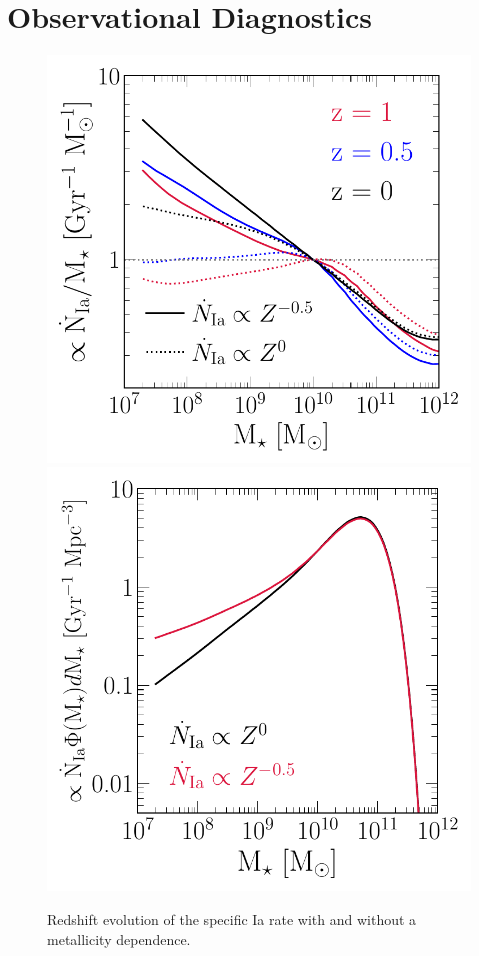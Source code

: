 \documentclass[ms.tex]{subfiles}
\begin{document}
\section{Observational Diagnostics}
\label{sec:diagnostics}

\begin{figure}
\centering
\includegraphics[scale = 0.55]{umachine_iarate_redshiftevol.pdf}
\includegraphics[scale = 0.55]{ia_massdist.pdf}
\caption{
Redshift evolution of the specific Ia rate with and without a metallicity
dependence.
}
\label{fig:specia_zdep}
\end{figure}
\end{document}
